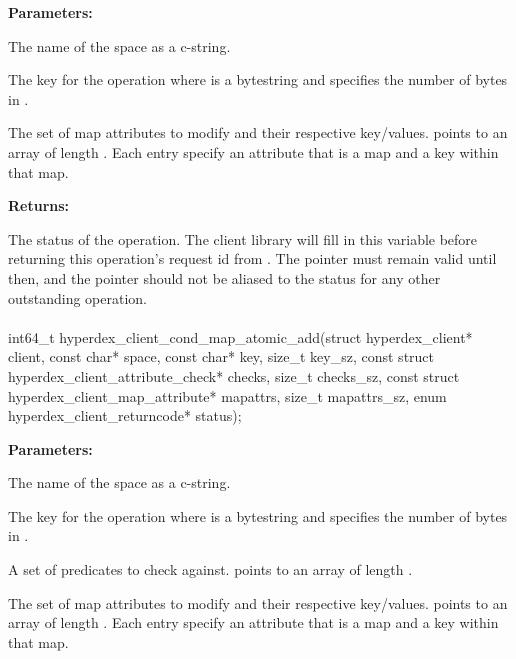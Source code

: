 \noindent\textbf{Parameters:}
\begin{description}[labelindent=\widthof{{\code{mapattrs}, \code{mapattrs\_sz}}},leftmargin=*,noitemsep,nolistsep,align=right]
\item[\code{space}] The name of the space as a c-string.
\item[\code{key}, \code{key\_sz}] The key for the operation where  is a bytestring and  specifies the number of bytes in .
\item[\code{mapattrs}, \code{mapattrs\_sz}] The set of map attributes to modify and their respective key/values.   points to an array of length .  Each entry specify an attribute that is a map and a key within that map.
\end{description}

\noindent\textbf{Returns:}
\begin{description}[labelindent=\widthof{{\code{status}}},leftmargin=*,noitemsep,nolistsep,align=right]
\item[\code{status}] The status of the operation.  The client library will fill in this variable before returning this operation's request id from .  The pointer must remain valid until then, and the pointer should not be aliased to the status for any other outstanding operation.
\end{description}

\paragraph{}
\label{api:c:cond_map_atomic_add}
\begin{ccode}
int64_t hyperdex_client_cond_map_atomic_add(struct hyperdex_client* client,
        const char* space,
        const char* key, size_t key_sz,
        const struct hyperdex_client_attribute_check* checks, size_t checks_sz,
        const struct hyperdex_client_map_attribute* mapattrs, size_t mapattrs_sz,
        enum hyperdex_client_returncode* status);
\end{ccode}
\funcdesc 

\noindent\textbf{Parameters:}
\begin{description}[labelindent=\widthof{{\code{mapattrs}, \code{mapattrs\_sz}}},leftmargin=*,noitemsep,nolistsep,align=right]
\item[\code{space}] The name of the space as a c-string.
\item[\code{key}, \code{key\_sz}] The key for the operation where  is a bytestring and  specifies the number of bytes in .
\item[\code{checks}, \code{checks\_sz}] A set of predicates to check against.   points to an array of length .
\item[\code{mapattrs}, \code{mapattrs\_sz}] The set of map attributes to modify and their respective key/values.   points to an array of length .  Each entry specify an attribute that is a map and a key within that map.
\end{description}

